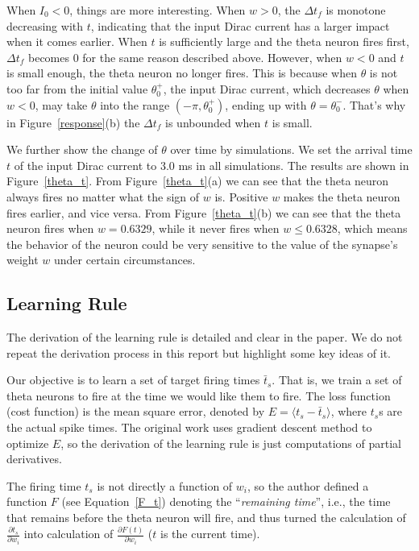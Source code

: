 When $I_0 < 0$, things are more interesting. When $w > 0$, the $\Delta t_f$ is monotone decreasing
with $t$, indicating that the input Dirac current has a larger impact when it comes earlier.
When $t$ is sufficiently large and the theta neuron fires first, 
$\Delta t_f$ becomes $0$ for the same reason described above.
However, when $w < 0$ and $t$ is small enough, the theta neuron no longer fires. This is because
when $\theta$ is not too far from the initial value $\theta_0^+$, the input Dirac current, which decreases
$\theta$ when $w < 0$, may take $\theta$ into the range $(-\pi, \theta_0^+)$, ending up with
$\theta = \theta_0^-$. That's why in Figure~\ref{response}(b) the $\Delta t_f$ is unbounded when $t$ is small.


We further show the change of $\theta$ over time by simulations.
We set the arrival time $t$ of the input Dirac current to $3.0$ ms in all simulations.
The results are shown in Figure~\ref{theta_t}.
From Figure~\ref{theta_t}(a) we can see that the theta neuron always fires no matter what the sign
of $w$ is. Positive $w$ makes the theta neuron fires earlier, and vice versa. 
From Figure~\ref{theta_t}(b) we can see that the theta neuron fires when $w=0.6329$, while it never
fires when $w \leq 0.6328$, which means the behavior of the neuron could be very sensitive to the value of
the synapse's weight $w$ under certain circumstances.


\subsection{Learning Rule}

The derivation of the learning rule is detailed and clear in the paper. 
We do not repeat the derivation process in this report but highlight some key ideas of it.

Our objective is to learn a set of target firing times $\bar t_s$. That is, we train a set of theta neurons
to fire at the time we would like them to fire. The loss function (cost function) is the mean square error,
denoted by $E = \langle t_s - \bar {t}_s\rangle$, where $t_s$s are the actual spike times.
The original work uses gradient descent method to optimize $E$, so the derivation of the learning rule
is just computations of partial derivatives.

The firing time $t_s$ is not directly a function of $w_i$, so the author defined a function $F$ 
(see Equation~\ref{F_t}) 
denoting the ``\emph{remaining time}'', i.e., the time that remains before the theta neuron will fire, and thus turned
the calculation of $\frac{\partial t_s}{\partial w_i}$ into calculation of $\frac{\partial F(t)}{\partial w_i}$
($t$ is the current time). 

